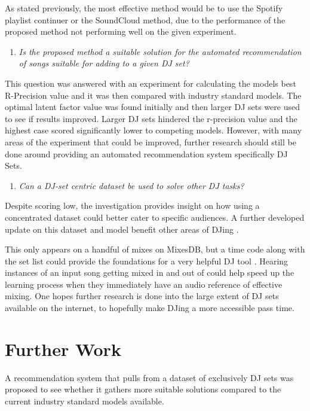 As stated previously, the most effective method would be to use the Spotify playlist continuer or the SoundCloud method, due to the performance of the proposed method not performing well on the given experiment. 

\begin{enumerate}
	\item \textit{Is the proposed method a suitable solution for the automated recommendation of songs suitable for adding to a given DJ set?}
\end{enumerate}

This question was answered with an experiment for calculating the models best R-Precision value and it was then compared with industry standard models. The optimal latent factor value was found initially and then larger DJ sets were used to see if results improved. Larger DJ sets hindered the r-precision value and the highest case scored significantly lower to competing models. However, with many areas of the experiment that could be improved, further research should still be done  around providing an automated recommendation system specifically DJ Sets.

\begin{enumerate}
	\item \textit{Can a DJ-set centric dataset be used to solve other DJ tasks?}
\end{enumerate}

Despite scoring low, the investigation provides insight on how using a concentrated dataset could better cater to specific audiences. A further developed update on this dataset and model benefit other areas of DJing . 

This only appears on a handful of mixes on MixesDB, but a time code along with the set list could provide the foundations for a very helpful DJ tool \citep{mixesdb_2015-01-02_2015}. Hearing instances of an input song getting mixed in and out of could help speed up the learning process when they immediately have an audio reference of effective mixing. One hopes further research is done into the large extent of DJ sets available on the internet, to hopefully make DJing a more accessible pass time. 

\section{Further Work}

A recommendation system that pulls from a dataset of exclusively DJ sets was proposed to see whether it gathers more suitable solutions compared to the current industry standard models available. 

